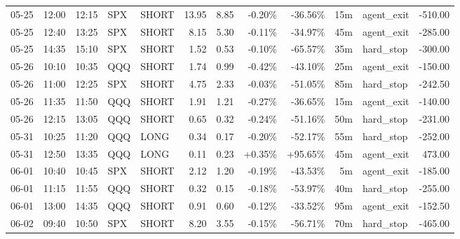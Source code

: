 \documentclass[11pt,a4paper,twoside]{article}
\begin{document}
\begin{center}
\begin{longtable}{>{\color{txtmain}}l l l l l r r r r r >{\color{txtmain}}l r}
05-25 & 12:00 & 12:15 & SPX & SHORT & 13.95 & 8.85 & \textcolor{lossred}{-0.20\%} & \textcolor{lossred}{-36.56\%} & 15m & agent\_exit & \textcolor{lossred}{-510.00} \\
05-25 & 12:40 & 13:25 & SPX & SHORT & 8.15 & 5.30 & \textcolor{lossred}{-0.11\%} & \textcolor{lossred}{-34.97\%} & 45m & agent\_exit & \textcolor{lossred}{-285.00} \\
05-25 & 14:35 & 15:10 & SPX & SHORT & 1.52 & 0.53 & \textcolor{lossred}{-0.10\%} & \textcolor{lossred}{-65.57\%} & 35m & hard\_stop & \textcolor{lossred}{-300.00} \\
05-26 & 10:10 & 10:35 & QQQ & SHORT & 1.74 & 0.99 & \textcolor{lossred}{-0.42\%} & \textcolor{lossred}{-43.10\%} & 25m & agent\_exit & \textcolor{lossred}{-150.00} \\
05-26 & 11:00 & 12:25 & SPX & SHORT & 4.75 & 2.33 & \textcolor{lossred}{-0.03\%} & \textcolor{lossred}{-51.05\%} & 85m & hard\_stop & \textcolor{lossred}{-242.50} \\
05-26 & 11:35 & 11:50 & QQQ & SHORT & 1.91 & 1.21 & \textcolor{lossred}{-0.27\%} & \textcolor{lossred}{-36.65\%} & 15m & agent\_exit & \textcolor{lossred}{-140.00} \\
05-26 & 12:15 & 13:05 & QQQ & SHORT & 0.65 & 0.32 & \textcolor{lossred}{-0.24\%} & \textcolor{lossred}{-51.16\%} & 50m & hard\_stop & \textcolor{lossred}{-231.00} \\
05-31 & 10:25 & 11:20 & QQQ & LONG & 0.34 & 0.17 & \textcolor{lossred}{-0.20\%} & \textcolor{lossred}{-52.17\%} & 55m & hard\_stop & \textcolor{lossred}{-252.00} \\
05-31 & 12:50 & 13:35 & QQQ & LONG & 0.11 & 0.23 & \textcolor{wingreen}{+0.35\%} & \textcolor{wingreen}{+95.65\%} & 45m & agent\_exit & \textcolor{wingreen}{473.00} \\
06-01 & 10:40 & 10:45 & SPX & SHORT & 2.12 & 1.20 & \textcolor{lossred}{-0.19\%} & \textcolor{lossred}{-43.53\%} & 5m & agent\_exit & \textcolor{lossred}{-185.00} \\
06-01 & 11:15 & 11:55 & QQQ & SHORT & 0.32 & 0.15 & \textcolor{lossred}{-0.18\%} & \textcolor{lossred}{-53.97\%} & 40m & hard\_stop & \textcolor{lossred}{-255.00} \\
06-01 & 13:00 & 14:35 & QQQ & SHORT & 0.91 & 0.60 & \textcolor{lossred}{-0.12\%} & \textcolor{lossred}{-33.52\%} & 95m & agent\_exit & \textcolor{lossred}{-152.50} \\
06-02 & 09:40 & 10:50 & SPX & SHORT & 8.20 & 3.55 & \textcolor{lossred}{-0.15\%} & \textcolor{lossred}{-56.71\%} & 70m & hard\_stop & \textcolor{lossred}{-465.00} \\

\end{longtable}
\end{center}
\end{document}
